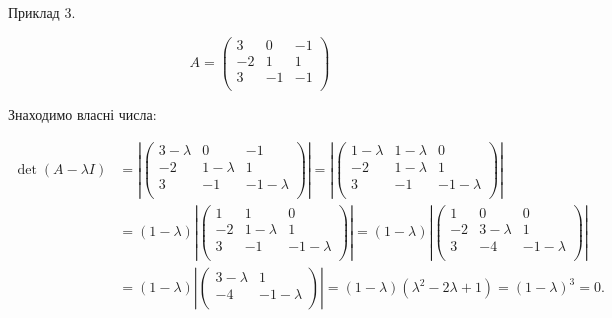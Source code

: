 Приклад 3.

$$A = \begin{pmatrix}
	3  &  0 & -1 \\
	-2 &  1 &  1 \\
	3  & -1 & -1 \\
\end{pmatrix} $$

Знаходимо власні числа:

\begin{equation*}
    \begin{split}
        \det(A-\lambda I)
        & = \left| \begin{pmatrix}
            3 - \lambda & 0           & -1 \\
            -2          & 1 - \lambda & 1 \\
            3           & -1          & -1 -\lambda \\
        \end{pmatrix} \right|
        = \left| \begin{pmatrix}
            1 - \lambda & 1 - \lambda & 0 \\
            -2          & 1 - \lambda & 1 \\
            3           & -1          & -1 -\lambda \\
        \end{pmatrix} \right|\\
        & = (1 - \lambda) \left| \begin{pmatrix}
            1  & 1           & 0 \\
            -2 & 1 - \lambda & 1 \\
            3  & -1          & -1 -\lambda \\
        \end{pmatrix} \right|
        = (1 - \lambda) \left| \begin{pmatrix}
            1  & 0           & 0 \\
            -2 & 3 - \lambda & 1 \\
            3  & -4          & -1 -\lambda \\
        \end{pmatrix} \right|\\
        & = (1 - \lambda) \left| \begin{pmatrix}
            3 - \lambda & 1 \\
            -4          & -1 -\lambda \\
        \end{pmatrix} \right|
        = (1 - \lambda)(\lambda^2 - 2\lambda + 1)
        = (1 - \lambda)^3 = 0.
    \end{split}
\end{equation*}

